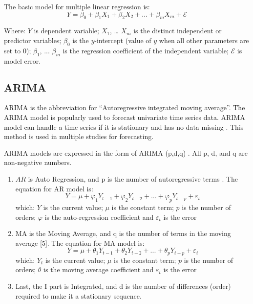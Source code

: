 \documentclass{ieeeojies}
\begin{document}
The basic model for multiple linear regression is:
\begin{equation}
    Y = \beta_0 + \beta_1X_1 + \beta_2X_2 + ... + \beta_mX_m + \mathcal{E}
\end{equation}

Where: $Y$ is dependent variable; $X_1$, … $X_m$ is the distinct independent or predictor variables; $\beta_0$ is the $y$-intercept (value of $y$ when all other parameters are set to 0); $\beta_1$, ... $\beta_m$ is the regression coefficient of the independent variable; $\mathcal{E}$ is model error.

\subsection{ARIMA}
ARIMA is the abbreviation for “Autoregressive integrated moving average”. The ARIMA model is popularly used to forecast univariate time series data. ARIMA model can handle a time series if it is stationary and has no data missing \cite{b6}. This method is used in multiple studies for forecasting.

ARIMA models are expressed in the form of ARIMA (p,d,q) \cite{b7}. All p, d, and q are non-negative numbers.

\begin{enumerate}
    \item$AR$ is Auto Regression, and p is the number of autoregressive terms \cite{b8}. The equation for AR model is:
          \begin{equation}
              Y = \mu + \varphi_1Y_{t-1} + \varphi_2Y_{t-2} + ... + \varphi_pY_{t-p} + \varepsilon_t
          \end{equation}
          which: $Y$ is the current value; $\mu$ is the constant term; $p$ is the number of orders; $\varphi$ is the auto-regression coefficient and $\varepsilon_t$ is the error
    \item MA is the Moving Average, and q is the number of terms in the moving average [5]. The equation for MA model is:
          \begin{equation}
              Y = \mu + \theta_1Y_{t-1} + \theta_2Y_{t-2} + ... + \theta_pY_{t-p} + \varepsilon_t
          \end{equation}
          which: $Y_t$ is the current value; $\mu$ is the constant term; $p$ is the number of orders; $\theta$ is the moving average coefficient and $\varepsilon_t$ is the error
    \item Last, the I part is Integrated, and d is the number of differences (order) required to make it a stationary sequence.
\end{enumerate}
\end{document}
